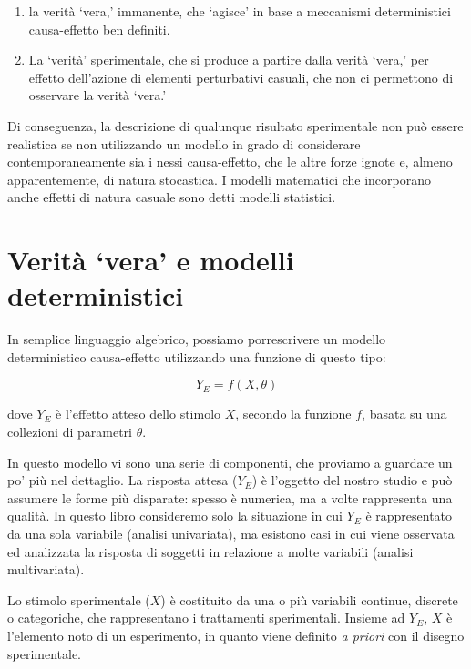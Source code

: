 \documentclass[a4paper,12pt,oneside]{book}
\providecommand{\tightlist}{%
  \setlength{\itemsep}{0pt}\setlength{\parskip}{0pt}}
\begin{document}
\begin{enumerate}
\def\labelenumi{\arabic{enumi}.}
\tightlist
\item
  la verità `vera,' immanente, che `agisce' in base a meccanismi deterministici causa-effetto ben definiti.
\item
  La `verità' sperimentale, che si produce a partire dalla verità `vera,' per effetto dell'azione di elementi perturbativi casuali, che non ci permettono di osservare la verità `vera.'
\end{enumerate}

Di conseguenza, la descrizione di qualunque risultato sperimentale non può essere realistica se non utilizzando un modello in grado di considerare contemporaneamente sia i nessi causa-effetto, che le altre forze ignote e, almeno apparentemente, di natura stocastica. I modelli matematici che incorporano anche effetti di natura casuale sono detti modelli statistici.

\hypertarget{verituxe0-vera-e-modelli-deterministici}{%
\section{Verità `vera' e modelli deterministici}\label{verituxe0-vera-e-modelli-deterministici}}

In semplice linguaggio algebrico, possiamo porrescrivere un modello deterministico causa-effetto utilizzando una funzione di questo tipo:

\[ Y_E = f(X, \theta) \]

dove \(Y_E\) è l'effetto atteso dello stimolo \(X\), secondo la funzione \(f\), basata su una collezioni di parametri \(\theta\).

In questo modello vi sono una serie di componenti, che proviamo a guardare un po' più nel dettaglio. La risposta attesa (\(Y_E\)) è l'oggetto del nostro studio e può assumere le forme più disparate: spesso è numerica, ma a volte rappresenta una qualità. In questo libro consideremo solo la situazione in cui \(Y_E\) è rappresentato da una sola variabile (analisi univariata), ma esistono casi in cui viene osservata ed analizzata la risposta di soggetti in relazione a molte variabili (analisi multivariata).

Lo stimolo sperimentale (\(X\)) è costituito da una o più variabili continue, discrete o categoriche, che rappresentano i trattamenti sperimentali. Insieme ad \(Y_E\), \(X\) è l'elemento noto di un esperimento, in quanto viene definito \emph{a priori} con il disegno sperimentale.
\end{document}

